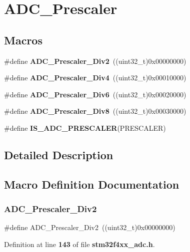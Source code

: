 \section{A\+D\+C\+\_\+\+Prescaler}
\label{group__ADC__Prescaler}
\subsection*{Macros}
\begin{DoxyCompactItemize}
\item 
\#define \textbf{ A\+D\+C\+\_\+\+Prescaler\+\_\+\+Div2}~((uint32\+\_\+t)0x00000000)
\item 
\#define \textbf{ A\+D\+C\+\_\+\+Prescaler\+\_\+\+Div4}~((uint32\+\_\+t)0x00010000)
\item 
\#define \textbf{ A\+D\+C\+\_\+\+Prescaler\+\_\+\+Div6}~((uint32\+\_\+t)0x00020000)
\item 
\#define \textbf{ A\+D\+C\+\_\+\+Prescaler\+\_\+\+Div8}~((uint32\+\_\+t)0x00030000)
\item 
\#define \textbf{ I\+S\+\_\+\+A\+D\+C\+\_\+\+P\+R\+E\+S\+C\+A\+L\+ER}(P\+R\+E\+S\+C\+A\+L\+ER)
\end{DoxyCompactItemize}


\subsection{Detailed Description}


\subsection{Macro Definition Documentation}
\mbox{\label{group__ADC__Prescaler_gaedf3593442796684ace09bce1c6a5dde}} 
\subsubsection{A\+D\+C\+\_\+\+Prescaler\+\_\+\+Div2}
{\footnotesize\ttfamily \#define A\+D\+C\+\_\+\+Prescaler\+\_\+\+Div2~((uint32\+\_\+t)0x00000000)}



Definition at line \textbf{ 143} of file \textbf{ stm32f4xx\+\_\+adc.\+h}.

